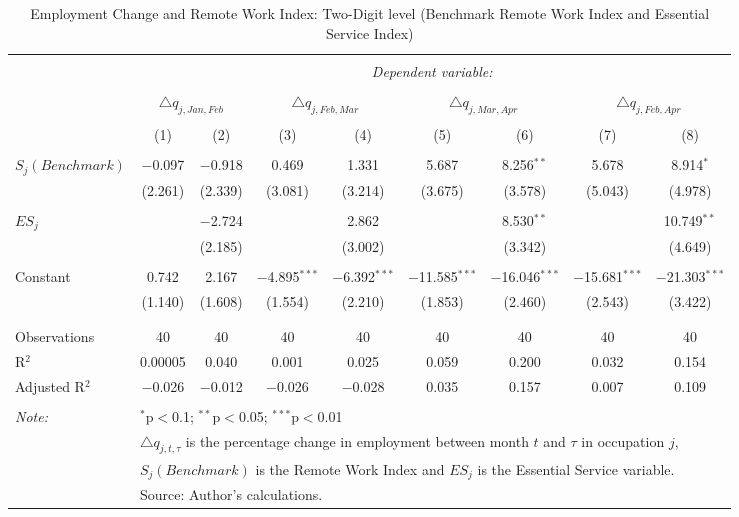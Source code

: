 
\begin{table}[!htbp] \centering 
  \caption{Employment Change and Remote Work Index: Two-Digit level (Benchmark Remote Work Index and Essential Service Index)} 
  \label{tab:regression_dynamics_2digit_robustness_essential_service} 
\footnotesize 
\begin{tabular}{@{\extracolsep{5pt}}lcccccccc} 
\\[-1.8ex]\hline 
\hline \\[-1.8ex] 
 & \multicolumn{8}{c}{\textit{Dependent variable:}} \\ 
\cline{2-9} 
\\[-1.8ex] & \multicolumn{2}{c}{$\triangle q_{j,Jan,Feb}$} & \multicolumn{2}{c}{$\triangle q_{j,Feb,Mar}$} & \multicolumn{2}{c}{$\triangle q_{j,Mar,Apr}$} & \multicolumn{2}{c}{$\triangle q_{j,Feb,Apr}$} \\ 
\\[-1.8ex] & (1) & (2) & (3) & (4) & (5) & (6) & (7) & (8)\\ 
\hline \\[-1.8ex] 
 $S_{j} (Benchmark)$ & $-$0.097 & $-$0.918 & 0.469 & 1.331 & 5.687 & 8.256$^{**}$ & 5.678 & 8.914$^{*}$ \\ 
  & (2.261) & (2.339) & (3.081) & (3.214) & (3.675) & (3.578) & (5.043) & (4.978) \\ 
  & & & & & & & & \\ 
 $ES_{j}$ &  & $-$2.724 &  & 2.862 &  & 8.530$^{**}$ &  & 10.749$^{**}$ \\ 
  &  & (2.185) &  & (3.002) &  & (3.342) &  & (4.649) \\ 
  & & & & & & & & \\ 
 Constant & 0.742 & 2.167 & $-$4.895$^{***}$ & $-$6.392$^{***}$ & $-$11.585$^{***}$ & $-$16.046$^{***}$ & $-$15.681$^{***}$ & $-$21.303$^{***}$ \\ 
  & (1.140) & (1.608) & (1.554) & (2.210) & (1.853) & (2.460) & (2.543) & (3.422) \\ 
  & & & & & & & & \\ 
\hline \\[-1.8ex] 
Observations & 40 & 40 & 40 & 40 & 40 & 40 & 40 & 40 \\ 
R$^{2}$ & 0.00005 & 0.040 & 0.001 & 0.025 & 0.059 & 0.200 & 0.032 & 0.154 \\ 
Adjusted R$^{2}$ & $-$0.026 & $-$0.012 & $-$0.026 & $-$0.028 & 0.035 & 0.157 & 0.007 & 0.109 \\ 
\hline 
\hline \\[-1.8ex] 
\textit{Note:}  & \multicolumn{8}{l}{$^{*}$p$<$0.1; $^{**}$p$<$0.05; $^{***}$p$<$0.01} \\ 
 & \multicolumn{8}{l}{$\triangle q_{j,t,\tau}$ is the percentage change in employment between month $t$ and $\tau$ in occupation $j$,} \\ 
 & \multicolumn{8}{l}{$S_{j} (Benchmark)$ is the Remote Work Index and $ES_{j}$ is the Essential Service variable.} \\ 
 & \multicolumn{8}{l}{Source: Author's calculations.} \\ 
\end{tabular} 
\end{table} 
